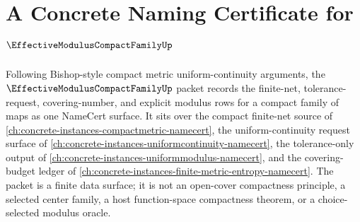 \chapter{A Concrete Naming Certificate for $\EffectiveModulusCompactFamilyUp$}
\label{ch:concrete-instances-effective-modulus-compact-family-namecert}

Following Bishop-style compact metric uniform-continuity arguments, the $\EffectiveModulusCompactFamilyUp$ packet records the finite-net, tolerance-request, covering-number, and explicit modulus rows for a compact family of maps as one NameCert surface. It sits over the compact finite-net source of \autoref{ch:concrete-instances-compactmetric-namecert}, the uniform-continuity request surface of \autoref{ch:concrete-instances-uniformcontinuity-namecert}, the tolerance-only output of \autoref{ch:concrete-instances-uniformmodulus-namecert}, and the covering-budget ledger of \autoref{ch:concrete-instances-finite-metric-entropy-namecert}. The packet is a finite data surface; it is not an open-cover compactness principle, a selected center family, a host function-space compactness theorem, or a choice-selected modulus oracle.

